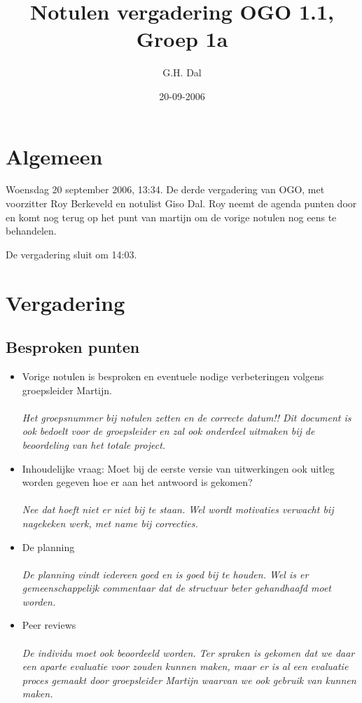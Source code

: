 \documentclass[11pt]{article}
\title{Notulen vergadering OGO 1.1, Groep 1a}
\author{G.H. Dal}
\date{20-09-2006}
\begin{document}
\maketitle


\section{Algemeen}

Woensdag 20 september 2006, 13:34. De derde vergadering van OGO, met
voorzitter Roy Berkeveld en notulist Giso Dal. Roy neemt de agenda
punten door en komt nog terug op het punt van martijn om de vorige
notulen nog eens te behandelen.


De vergadering sluit om 14:03.


\section{Vergadering}

\subsection{Besproken punten}

\begin{itemize}


\item Vorige notulen is besproken en eventuele nodige verbeteringen
volgens groepsleider Martijn.\\
\\
\emph{Het groepsnummer bij notulen zetten en de correcte datum!! Dit
document is ook bedoelt voor de groepsleider en zal ook onderdeel
uitmaken bij de beoordeling van het totale project.}
\\
\item Inhoudelijke vraag: Moet bij de eerste versie van uitwerkingen
ook uitleg worden gegeven hoe er aan het antwoord is gekomen?
\\\\
\emph{Nee dat hoeft niet er niet bij te staan. Wel wordt motivaties
verwacht bij nagekeken werk, met name bij correcties.}
\\
\item De planning
\\\\
\emph{De planning vindt iedereen goed en is goed bij te houden. Wel
is er gemeenschappelijk commentaar dat de structuur beter
gehandhaafd moet worden.}
\\
\item Peer reviews
\\\\
\emph{De individu moet ook beoordeeld worden. Ter spraken is gekomen
dat we daar een aparte evaluatie voor zouden kunnen maken, maar er
is al een evaluatie proces gemaakt door groepsleider Martijn waarvan
we ook gebruik van kunnen maken.}

\end{itemize}
\end{document}
